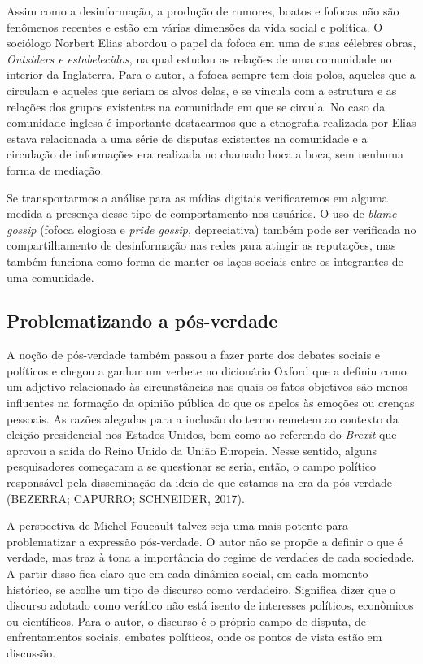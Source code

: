 Assim como a desinformação, a produção de rumores, boatos e fofocas não
são fenômenos recentes e estão em várias dimensões da vida social e
política. O sociólogo Norbert Elias abordou o papel da fofoca em uma de
suas célebres obras, \emph{Outsiders e estabelecidos}, na qual estudou
as relações de uma comunidade no interior da Inglaterra. Para o autor, a
fofoca sempre tem dois polos, aqueles que a circulam e aqueles que
seriam os alvos delas, e se vincula com a estrutura e as relações dos
grupos existentes na comunidade em que se circula. No caso da comunidade
inglesa é importante destacarmos que a etnografia realizada por Elias
estava relacionada a uma série de disputas existentes na comunidade e a
circulação de informações era realizada no chamado boca a boca, sem
nenhuma forma de mediação.

Se transportarmos a análise para as mídias digitais verificaremos em
alguma medida a presença desse tipo de comportamento nos usuários. O uso
de \emph{blame gossip} (fofoca elogiosa e \emph{pride gossip},
depreciativa) também pode ser verificada no compartilhamento de
desinformação nas redes para atingir as reputações, mas também funciona
como forma de manter os laços sociais entre os integrantes de uma
comunidade.

\subsection{Problematizando a pós-verdade}

A noção de pós-verdade também passou a fazer parte dos debates sociais e
políticos e chegou a ganhar um verbete no dicionário Oxford que a
definiu como um adjetivo relacionado às circunstâncias nas quais os
fatos objetivos são menos influentes na formação da opinião pública do
que os apelos às emoções ou crenças pessoais. As razões alegadas para a
inclusão do termo remetem ao contexto da eleição presidencial nos
Estados Unidos, bem como ao referendo do \emph{Brexit} que aprovou a
saída do Reino Unido da União Europeia. Nesse sentido, alguns
pesquisadores começaram a se questionar se seria, então, o campo
político responsável pela disseminação da ideia de que estamos na era da
pós-verdade (BEZERRA; CAPURRO; SCHNEIDER, 2017).

A perspectiva de Michel Foucault talvez seja uma mais potente para
problematizar a expressão pós-verdade. O autor não se propõe a definir o
que é verdade, mas traz à tona a importância do regime de verdades de
cada sociedade. A partir disso fica claro que em cada dinâmica social,
em cada momento histórico, se acolhe um tipo de discurso como
verdadeiro. Significa dizer que o discurso adotado como verídico não
está isento de interesses políticos, econômicos ou científicos. Para o
autor, o discurso é o próprio campo de disputa, de enfrentamentos
sociais, embates políticos, onde os pontos de vista estão em discussão.

